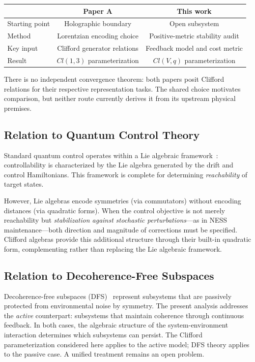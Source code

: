 \documentclass[12pt,a4paper,openany]{book}
\begin{document}
\begin{center}
\begin{tabular}{@{}lcc@{}}
\toprule
& \textbf{Paper A} & \textbf{This work} \\
\midrule
Starting point & Holographic boundary & Open subsystem \\
Method & Lorentzian encoding choice & Positive-metric stability audit \\
Key input & Clifford generator relations & Feedback model and cost metric \\
Result & $Cl(1,3)$ parameterization & $Cl(V,q)$ parameterization \\
\bottomrule
\end{tabular}
\end{center}

There is no independent convergence theorem: both papers posit Clifford relations for their respective representation tasks.  The shared choice motivates comparison, but neither route currently derives it from its upstream physical premises.

\subsection{Relation to Quantum Control Theory}

Standard quantum control operates within a Lie algebraic framework~\cite{WisemanMilburn2009}: controllability is characterized by the Lie algebra generated by the drift and control Hamiltonians.
This framework is complete for determining \emph{reachability} of target states.

However, Lie algebras encode symmetries (via commutators) without encoding distances (via quadratic forms).
When the control objective is not merely reachability but \emph{stabilization against stochastic perturbations}---as in NESS maintenance---both direction and magnitude of corrections must be specified.
Clifford algebras provide this additional structure through their built-in quadratic form, complementing rather than replacing the Lie algebraic framework.

\subsection{Relation to Decoherence-Free Subspaces}

Decoherence-free subspaces (DFS)~\cite{Zanardi2001,Lidar2003} represent subsystems that are passively protected from environmental noise by symmetry.
The present analysis addresses the \emph{active} counterpart: subsystems that maintain coherence through continuous feedback.
In both cases, the algebraic structure of the system-environment interaction determines which subsystems can persist.
The Clifford parameterization considered here applies to the active model; DFS theory applies to the passive case.
A unified treatment remains an open problem.
\end{document}
